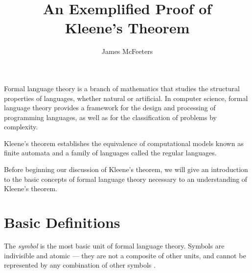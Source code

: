 \documentclass{bcthesis}
\title{An Exemplified Proof of\\ Kleene's Theorem}
\author{James McFeeters}
\newif\ifbuildfrontmatter
\newcommand{\footcite}[2]{\xspace\cite[pg.~{#2}]{#1}\xspace}
\begin{document}
\ifbuildfrontmatter
\frontmatter

	\maketitle

	\begin{abstract}
		This paper offers a proof of Kleene's theorem, accompanied by the necessary background in formal language theory, as well as detailed examples illustrating key points. 
		There is also a brief discussion of the importance and application of Kleene's theorem in practice.		
	\end{abstract}


	\begin{acknowledgments}
		I thank Darrah Chavey for his capable advising and for introducing me to the topic.
		I thank Cameron Kuchta for proofreading my paper, and Simon Tomlinson for proofreading my paper and assisting me in writing the program used to produce examples.
	\end{acknowledgments}

	\tableofcontents
	\clearpage
\fi

\mainmatter
{}
\label{ch:basics}

	Formal language theory is a branch of mathematics that studies the structural properties of languages, whether natural or artificial.
	In computer science, formal language theory provides a framework for the design and processing of programming languages, as well as for the classification of problems by complexity.

	Kleene's theorem establishes the equivalence of computational models known as finite automata and a family of languages called the regular languages.

	Before beginning our discussion of Kleene's theorem, we will give an introduction to the basic concepts of formal language theory necessary to an understanding of Kleene's theorem.

	\section{Basic Definitions} %
	\label{sec:basic_definitions}
		\begin{definition}[Symbol]
			The \textit{symbol} is the most basic unit of formal language theory.
			Symbols are indivisible and atomic --- they are not a composite of other units, and cannot be represented by any combination of other symbols \footcite{hopcroft}{1}.
		\end{definition}
\end{document}
